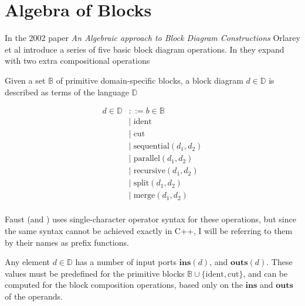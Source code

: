 \chapter{Algebra of Blocks}

\newcommand{\Ident}{\ensuremath{\textrm{ident}}}
\newcommand{\Cut}{\ensuremath{\textrm{cut}}}
\newcommand{\Sequential}{\ensuremath{\textrm{sequential}}}
\newcommand{\Parallel}{\ensuremath{\textrm{parallel}}}
\newcommand{\Recursive}{\ensuremath{\textrm{recursive}}}
\newcommand{\Split}{\ensuremath{\textrm{split}}}
\newcommand{\Merge}{\ensuremath{\textrm{merge}}}
\newcommand{\Ins}{\ensuremath{\textbf{ins}}}
\newcommand{\Outs}{\ensuremath{\textbf{outs}}}

In the 2002 paper \emph{An Algebraic approach to Block Diagram Constructions}\autocite{orlarey2002} Orlarey et al
introduce a series of five basic block diagram operations. In \autocite{orlarey2004} they expand with two extra
compositional operations

Given a set $\mathbb{B}$ of primitive domain-specific blocks, a block diagram $d \in \mathbb{D}$ is described as terms
of the language $\mathbb{D}$

\begin{align*}
  d\in \mathbb{D} & ::= b \in \mathbb{B}      \\
                  & |\; \Ident                \\
                  & |\; \Cut                  \\
                  & |\; \Sequential(d_1, d_2) \\
                  & |\; \Parallel(d_1, d_2)   \\
                  & |\; \Recursive(d_1, d_2)  \\
                  & |\; \Split(d_1, d_2)      \\
                  & |\; \Merge(d_1, d_2)      \\
\end{align*}

Faust (and \autocite{orlarey2002}) uses single-character operator syntax for these operations, but since the same
syntax cannot be achieved
exactly in C++, I will be referring to them by their names as prefix functions.

Any element $d \in \mathbb{D}$ has a number of input ports $\Ins(d)$, and $\Outs(d)$.
These
values must be predefined for the primitive blocks $\mathbb{B} \cup \{\Ident, \Cut\}$, and
can be computed for the block composition operations, based only on the $\Ins$ and
$\Outs$
of the operands.

